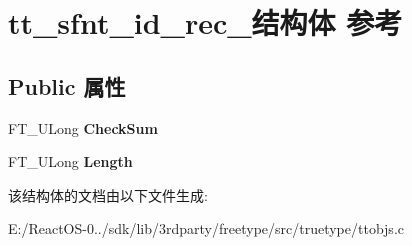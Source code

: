 \hypertarget{structtt__sfnt__id__rec__}{}\section{tt\+\_\+sfnt\+\_\+id\+\_\+rec\+\_\+结构体 参考}
\label{structtt__sfnt__id__rec__}
\subsection*{Public 属性}
\begin{DoxyCompactItemize}
\item 
\mbox{\label{structtt__sfnt__id__rec___aa877d3163cf93ea7c11a6c85fc6d1e16}} 
F\+T\+\_\+\+U\+Long {\bfseries Check\+Sum}
\item 
\mbox{\label{structtt__sfnt__id__rec___a6e0714ee8c759ef0b5039fea61c52a80}} 
F\+T\+\_\+\+U\+Long {\bfseries Length}
\end{DoxyCompactItemize}


该结构体的文档由以下文件生成\+:\begin{DoxyCompactItemize}
\item 
E\+:/\+React\+O\+S-\/0../sdk/lib/3rdparty/freetype/src/truetype/ttobjs.\+c\end{DoxyCompactItemize}
